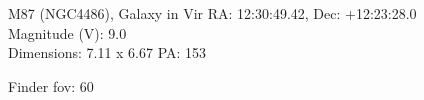 \begin{block}{M87 (NGC4486), Galaxy in Vir}
    RA: 12:30:49.42, Dec: +12:23:28.0 \\ 
    Magnitude (V): 9.0 \\ 
    Dimensions: 7.11 x 6.67 PA: 153 

    Finder fov: 60 
\end{block}